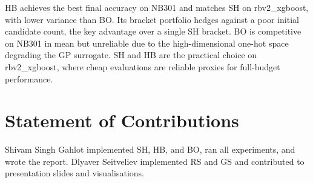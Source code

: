 \documentclass{AIM_report}
\begin{document}
HB achieves the best final accuracy on NB301 and matches SH on
rbv2\_xgboost, with lower variance than BO.
Its bracket portfolio hedges against a poor initial candidate count,
the key advantage over a single SH bracket.
BO is competitive on NB301 in mean but unreliable due to the
high-dimensional one-hot space degrading the GP surrogate.
SH and HB are the practical choice on rbv2\_xgboost, where cheap
evaluations are reliable proxies for full-budget performance.

\section*{Statement of Contributions}

Shivam Singh Gahlot implemented SH, HB, and BO, ran all experiments, and
wrote the report.
Dlyaver Seitveliev implemented RS and GS and contributed to presentation
slides and visualisations.



\end{document}
